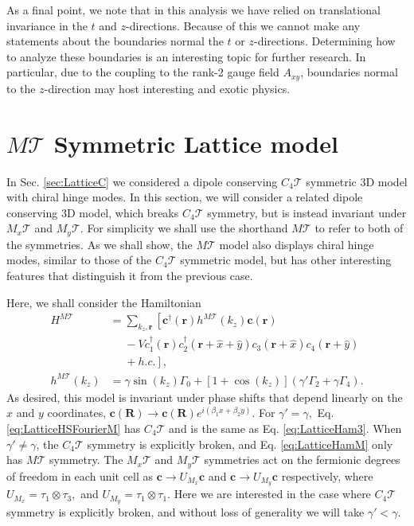 \documentclass[prb,aps,twocolumn,groupaddress,floatfix]{revtex4-1}
\begin{document}
As a final point, we note that in this analysis we have relied on translational invariance in the $t$ and $z$-directions.  Because of this we cannot make any statements about the boundaries normal the $t$ or $z$-directions. Determining how to analyze these boundaries is an interesting topic for further research. In particular, due to the coupling to the rank-2 gauge field $A_{xy}$, boundaries normal to the $z$-direction may host interesting and exotic physics.








\section{$M \mathcal{T}$ Symmetric Lattice model} \label{sec:LatticeM}
In Sec. \ref{sec:LatticeC} we considered a dipole conserving $C_4 \mathcal{T}$ symmetric $3$D model with chiral hinge modes. In this section, we will consider a related dipole conserving $3$D model, which breaks $C_4 \mathcal{T}$ symmetry, but is instead invariant under $M_x \mathcal{T}$ and $M_y \mathcal{T}$. For simplicity we shall use the shorthand $M\mathcal{T}$ to refer to both of the symmetries. As we shall show, the $M\mathcal{T}$ model also displays chiral hinge modes, similar to those of the $C_4 \mathcal{T}$ symmetric model, but has other interesting features that distinguish it from the previous case. 

Here, we shall consider the Hamiltonian
\begin{equation}
\begin{split}
H^{M\mathcal{T}} &= \sum_{k_z, \bm{r}}\left[ \bm{c}^\dagger(\bm{r}) h^{M\mathcal{T}}(k_z)  \bm{c}(\bm{r})\right. \\&\phantom{=} - V c_1^\dagger(\bm{r})c^\dagger_2(\bm{r}+\hat{x}+\hat{y})c_3(\bm{r}+\hat{x})c_4(\bm{r}+\hat{y}) \\&\phantom{=}+\left. h.c.\right],\\
h^{M\mathcal{T}}(k_z) &= \gamma \sin(k_z) \Gamma_0 + [1+\cos(k_z)](\gamma' \Gamma_2+\gamma \Gamma_4).
\end{split}\label{eq:LatticeHamM}
\end{equation}
As desired, this model is invariant under phase shifts that depend linearly on the $x$ and $y$ coordinates, $\bm{c}(\bm{R})\rightarrow \bm{c}(\bm{R}) e^{ i (\beta_1 x + \beta_2 y )}$.
For $\gamma' = \gamma,$ Eq. \ref{eq:LatticeHSFourierM} has $C_4 \mathcal{T}$ and is the same as Eq. \ref{eq:LatticeHam3}. When $\gamma' \neq \gamma$, the $C_4 \mathcal{T}$ symmetry is explicitly broken, and Eq. \ref{eq:LatticeHamM} only has $M \mathcal{T}$ symmetry. The $M_x \mathcal{T}$ and $M_y \mathcal{T}$ symmetries act on the fermionic degrees of freedom in each unit cell as $\bm{c} \rightarrow U_{M_x}  \bm{c}$ and $\bm{c} \rightarrow U_{M_y}  \bm{c}$ respectively, where $U_{M_x} = \tau_1 \otimes \tau_3,$ and $U_{M_y} = \tau_1 \otimes \tau_1$. Here we are interested in the case where $C_4 \mathcal{T}$ symmetry is explicitly broken, and without loss of generality we will take $\gamma' < \gamma$.
\end{document}

